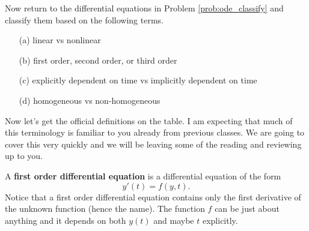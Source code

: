 \begin{problem}
    Now return to the differential equations in Problem \ref{prob:ode_classify} and
    classify them based on the following terms.
    \begin{enumerate}
        \item[(a)] linear vs nonlinear
        \item[(b)] first order, second order, or third order
        \item[(c)] explicitly dependent on time vs implicitly dependent on time
        \item[(d)] homogeneous vs non-homogeneous
    \end{enumerate}
\end{problem}


Now let's get the official definitions on the table.  I am expecting that much of this
terminology is familiar to you already from previous classes. We are going to cover this
very quickly and we will be leaving some of the reading and reviewing up to you.

\begin{definition}
    A {\bf first order differential equation} is a differential equation of the form 
    \[ y'(t) = f(y,t). \]
    Notice that a first order differential equation contains only the first derivative of
    the unknown function (hence the name).  The function $f$ can be just about anything
    and it depends on both $y(t)$ and maybe $t$ explicitly.
\end{definition}

